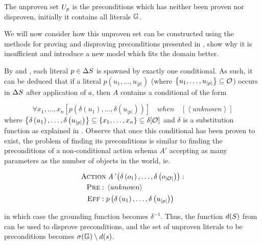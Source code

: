 \documentclass[\master/Master.tex]{subfiles}
\begin{document}
\begin{definition}
The unproven set $U_p$ is the preconditions which has neither been proven nor disproven, initially it contains all  literals $\mathbb{G}$.
\end{definition}

We will now consider how this unproven set can be constructed using the methods for proving and disproving preconditions presented in , show why it is insufficient and introduce a new model which fits the domain better.

By  and , each literal $p \in \Delta S$ is spawned by exactly one conditional. As such, it can be deduced that if a literal $p\left(u_1, \dots, u_{|p|}\right)$ (where $\left\{u_1, \dots, u_{|p|}\right\} \subseteq \mathcal{O}$) occurs in $\Delta S$ after application of $a$, then $A$ contains a conditional of the form

\begin{equation*}
    \forall x_1, \dots, x_n 
        \left[ p\left(\delta\left(u_1\right), \dots, \delta \left(u_{|p|}\right) \right) \right] \quad when \quad 
        \left[ \left<unknown\right> \right]
\end{equation*}
where $\left\{\delta \left( u_1 \right), \dots, \delta \left(u_{|p|} \right) \right\} \subseteq \left\{ x_1, \dots, x_n \right\} \subseteq \delta [\mathcal{O}]$ and $\delta$ is a substitution function as explained in . Observe that once this conditional has been proven to exist, the problem of finding its preconditions is similar to finding the preconditions of a non-conditional action schema $A'$ accepting as many parameters as the number of objects in the world, ie. 

\begin{align*}
    \begin{split}
        \textsc{Action} &\; \textit{A'}\left(\delta \left( o_1 \right), \ldots, \delta \left( o_{|\mathcal{O}|}\right)\right): \\
        \textsc{Pre}: \; & \left< unknown \right> \\
        \textsc{Eff}: \; & p\left( \delta \left(u_1\right), \dots, \delta \left( u_{|p|} \right)\right)
    \end{split}
\end{align*}

in which case the grounding function becomes $\delta^{-1}$. Thus, the function $d(S)$ from  can be used to disprove preconditions, and the set of unproven literals to be preconditions becomes $\sigma(\mathbb{G}) \setminus d(s)$.
\end{document}
